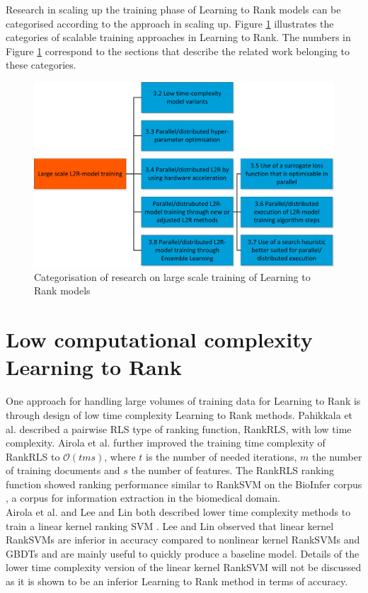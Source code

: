 Research in scaling up the training phase of Learning to Rank models can be categorised according to the approach in scaling up. Figure \ref{fig:related_work_categories} illustrates the categories of scalable training approaches in Learning to Rank. The numbers in Figure \ref{fig:related_work_categories} correspond to the sections that describe the related work belonging to these categories.

\begin{figure}
\includegraphics{gfx/related_work_categories}
\caption{Categorisation of research on large scale training of  Learning to Rank models}
\label{fig:related_work_categories}
\end{figure}

\section{Low computational complexity Learning to Rank}
\label{sec:related_work_low_complexity}
One approach for handling large volumes of training data for Learning to Rank is through design of low time complexity Learning to Rank methods. Pahikkala et al. \cite{Pahikkala2009} described a pairwise \ac{RLS} type of ranking function, RankRLS, with low time complexity. Airola et al. \cite{Airola2010} further improved the training time complexity of RankRLS to $\mathcal{O}(tms)$, where $t$ is the number of needed iterations, $m$ the number of training documents and $s$ the number of features. The RankRLS ranking function showed ranking performance similar to Rank\acs{SVM} \cite{Herbrich1999, Joachims2002} on the BioInfer corpus \cite{Pyysalo2007}, a corpus for information extraction in the biomedical domain.\\

Airola et al. \cite{Airola2011} and Lee and Lin \cite{Lee2014} both described lower time complexity methods to train a linear kernel ranking \ac{SVM} \cite{Herbrich1999, Joachims2002}. Lee and Lin \cite{Lee2014} observed that linear kernel Rank\ac{SVM}s are inferior in accuracy compared to nonlinear kernel Rank\ac{SVM}s and \ac{GBDT}s and are mainly useful to quickly produce a baseline model. Details of the lower time complexity version of the linear kernel Rank\ac{SVM} will not be discussed as it is shown to be an inferior Learning to Rank method in terms of accuracy.\\

